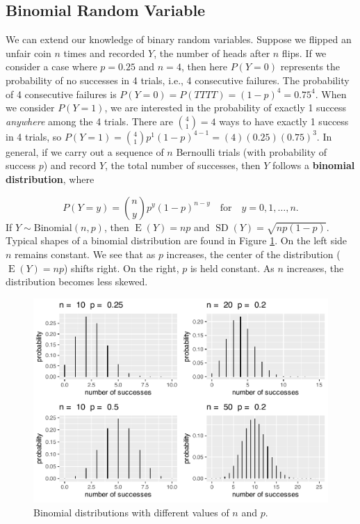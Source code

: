 \documentclass[
]{krantz}
\newcommand{\E}{\operatorname{E}}
\newcommand{\SD}{\operatorname{SD}}
\begin{document}
\hypertarget{sec-binomial}{%
\subsection{Binomial Random Variable}\label{sec-binomial}}

We can extend our knowledge of binary random variables. Suppose we flipped an unfair coin \(n\) times and recorded \(Y\), the number of heads after \(n\) flips. If we consider a case where \(p = 0.25\) and \(n = 4\), then here \(P(Y=0)\) represents the probability of no successes in 4 trials, i.e., 4 consecutive failures. The probability of 4 consecutive failures is \(P(Y = 0) = P(TTTT) = (1-p)^4 = 0.75^4\). When we consider \(P(Y = 1)\), we are interested in the probability of exactly 1 success \emph{anywhere} among the 4 trials. There are \(\binom{4}{1} = 4\) ways to have exactly 1 success in 4 trials, so \(P(Y = 1) = \binom{4}{1}p^1(1-p)^{4-1} = (4)(0.25)(0.75)^3\). In general, if we carry out a sequence of \(n\) Bernoulli trials (with probability of success \(p\)) and record \(Y\), the total number of successes, then \(Y\) follows a \textbf{binomial distribution},  where

\begin{equation}
P(Y=y) = \binom{n}{y} p^y (1-p)^{n-y} \quad \textrm{for} \quad y = 0, 1, \ldots, n.
\label{eq:binomRV}
\end{equation}
If \(Y \sim \textrm{Binomial}(n,p)\), then \(\E(Y) = np\) and \(\SD(Y) = \sqrt{np(1-p)}\).
Typical shapes of a binomial distribution are found in Figure \ref{fig:multBin}. On the left side \(n\) remains constant. We see that as \(p\) increases, the center of the distribution (\(\E(Y) = np\)) shifts right. On the right, \(p\) is held constant. As \(n\) increases, the distribution becomes less skewed.



\begin{figure}

{\centering \includegraphics[width=0.6\linewidth]{bookdown-BeyondMLR_files/figure-latex/multBin-1} 

}

\caption{Binomial distributions with different values of \(n\) and \(p\).}\label{fig:multBin}
\end{figure}
\end{document}

